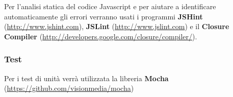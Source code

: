 		Per l'analisi statica del codice Javascript e per aiutare a identificare automaticamente gli errori verranno usati i programmi \textbf{JSHint} (\url{http://www.jshint.com}), \textbf{JSLint} (\url{http://www.jslint.com}) e il \textbf{Closure Compiler} (\url{http://developers.google.com/closure/compiler/}).
		
		
		\subsubsection{Test}
		
		Per i test di unità verrà utilizzata la libreria \textbf{Mocha} (\url{https://github.com/visionmedia/mocha})
		
		
